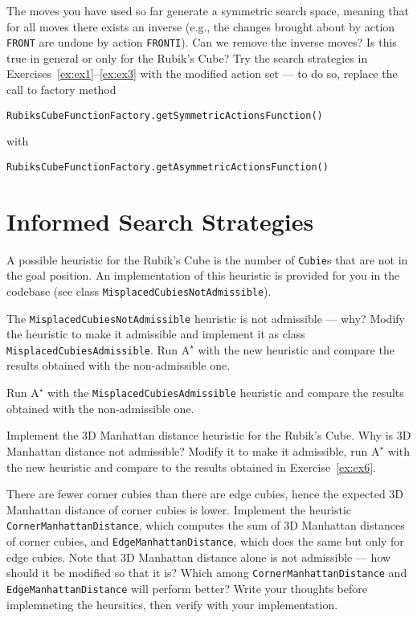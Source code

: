 \documentclass[a4paper]{article}
\begin{document}
{\ex{}\label{ex:ex4} The moves you have used so far generate a symmetric search space, meaning that for all moves there exists an inverse (e.g., the changes brought about by action {\tt FRONT} are undone by action {\tt FRONTI}).  Can we remove the inverse moves? Is this true in general or only for the Rubik's Cube? Try the search strategies in Exercises~\ref{ex:ex1}--\ref{ex:ex3} with the modified action set --- to do so, replace the call to factory method
\begin{lstlisting}
RubiksCubeFunctionFactory.getSymmetricActionsFunction()
\end{lstlisting}
with
\begin{lstlisting}
RubiksCubeFunctionFactory.getAsymmetricActionsFunction()
\end{lstlisting}
\vspace{0.1cm}}


\section{Informed Search Strategies}
A possible heuristic for the Rubik's Cube is the number of {\tt Cubie}s that are not in the goal position.  An implementation of this heuristic is provided for you in the codebase (see class {\tt MisplacedCubiesNotAdmissible}).

{\ex{}\label{ex:ex5} The {\tt MisplacedCubiesNotAdmissible} heuristic is not admissible --- why?  Modify the heuristic to make it admissible and implement it as class {\tt MisplacedCubiesAdmissible}. Run $\text{A}^\star$ with the new heuristic and compare the results obtained with the non-admissible one.\vspace{0.1cm}}

{\ex{}\label{ex:ex6} Run $\text{A}^\star$ with the {\tt MisplacedCubiesAdmissible} heuristic and compare the results obtained with the non-admissible one.\vspace{0.1cm}}

{\ex{}\label{ex:ex7} Implement the 3D Manhattan distance heuristic for the Rubik's Cube.  Why is 3D Manhattan distance not admissible?  Modify it to make it admissible, run $\text{A}^\star$ with the new heuristic and compare to the results obtained in Exercise~\ref{ex:ex6}.\vspace{0.1cm}}

{\ex{}\label{ex:ex8} There are fewer corner cubies than there are edge cubies, hence the expected 3D Manhattan distance of corner cubies is lower.  Implement the heuristic {\tt CornerManhattanDistance}, which computes the sum of 3D Manhattan distances of corner cubies, and {\tt EdgeManhattanDistance}, which does the same but only for edge cubies.  Note that 3D Manhattan distance alone is not admissible --- how should it be modified so that it is?  Which among {\tt CornerManhattanDistance} and {\tt EdgeManhattanDistance} will perform better?  Write your thoughts before implemneting the heursitics, then verify with your implementation.\vspace{0.1cm}}
\end{document}
